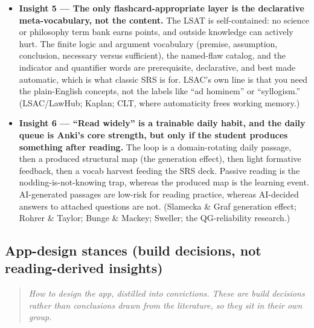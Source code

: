 \documentclass[11pt]{article}
\begin{document}
\begin{itemize}
\item \textbf{Insight 5 --- The only flashcard-appropriate layer is the declarative meta-vocabulary, not the content.} The LSAT is self-contained: no science or philosophy term bank earns points, and outside knowledge can actively hurt. The finite logic and argument vocabulary (premise, assumption, conclusion, necessary versus sufficient), the named-flaw catalog, and the indicator and quantifier words are prerequisite, declarative, and best made automatic, which is what classic SRS is for. LSAC's own line is that you need the plain-English concepts, not the labels like \enquote{ad hominem} or \enquote{syllogism.} (LSAC/LawHub; Kaplan; CLT, where automaticity frees working memory.)
\item \textbf{Insight 6 --- \enquote{Read widely} is a trainable daily habit, and the daily queue is Anki's core strength, but only if the student produces something after reading.} The loop is a domain-rotating daily passage, then a produced structural map (the generation effect), then light formative feedback, then a vocab harvest feeding the SRS deck. Passive reading is the nodding-is-not-knowing trap, whereas the produced map is the learning event. AI-generated passages are low-risk for reading practice, whereas AI-decided answers to attached questions are not. (Slamecka \& Graf generation effect; Rohrer \& Taylor; Bunge \& Mackey; Sweller; the QG-reliability research.)
\end{itemize}

\subsection*{App-design stances (build decisions, not reading-derived insights)}

\begin{quote}\itshape
How to design the app, distilled into convictions. These are build decisions rather than conclusions drawn from the literature, so they sit in their own group.
\end{quote}
\end{document}
